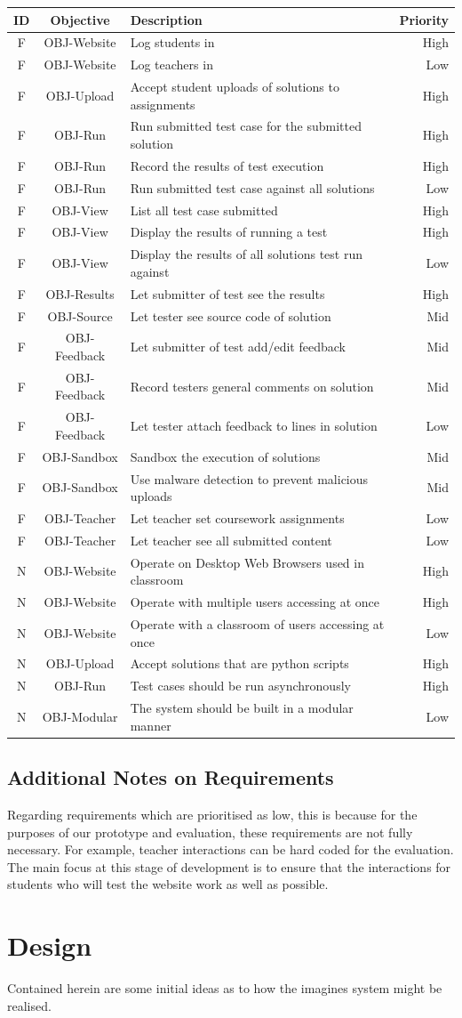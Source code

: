 \documentclass[a4paper,11pt]{report}
\newcounter{FunCount}
\newcounter{NFunCount}
\newcommand{\freq}[3]{\addtocounter{FunCount}{1}F\arabic{FunCount} & OBJ-#1 & #2 & #3\\}
\newcommand{\nfreq}[3]{\addtocounter{NFunCount}{1}N\arabic{NFunCount} & OBJ-#1 & #2 & #3\\}
\begin{document}
\begin{longtable}{cclr}
\textbf{ID} & \textbf{Objective} & \textbf{Description} & \textbf{Priority}\\\hline
\freq{Website}{Log students in}{High}
\freq{Website}{Log teachers in}{Low}
\freq{Upload}{Accept student uploads of solutions to assignments}{High}
\freq{Run}{Run submitted test case for the submitted solution}{High}
\freq{Run}{Record the results of test execution}{High}
\freq{Run}{Run submitted test case against all solutions}{Low}
\freq{View}{List all test case submitted}{High}
\freq{View}{Display the results of running a test}{High}
\freq{View}{Display the results of all solutions test run against}{Low}
\freq{Results}{Let submitter of test see the results}{High}
\freq{Source}{Let tester see source code of solution}{Mid}
\freq{Feedback}{Let submitter of test add/edit feedback}{Mid}
\freq{Feedback}{Record testers general comments on solution}{Mid}
\freq{Feedback}{Let tester attach feedback to lines in solution}{Low}
\freq{Sandbox}{Sandbox the execution of solutions}{Mid}
\freq{Sandbox}{Use malware detection to prevent malicious uploads}{Mid}
\freq{Teacher}{Let teacher set coursework assignments}{Low}
\freq{Teacher}{Let teacher see all submitted content}{Low}
\nfreq{Website}{Operate on Desktop Web Browsers used in classroom}{High}
\nfreq{Website}{Operate with multiple users accessing at once}{High}
\nfreq{Website}{Operate with a classroom of users accessing at once}{Low}
\nfreq{Upload}{Accept solutions that are python scripts}{High}
\nfreq{Run}{Test cases should be run asynchronously}{High}
\nfreq{Modular}{The system should be built in a modular manner}{Low}
\end{longtable}

\subsection{Additional Notes on Requirements}
Regarding requirements which are prioritised as low, this is because for the purposes of our prototype and evaluation, these requirements are not fully necessary. For example, teacher interactions can be hard coded for the evaluation. The main focus at this stage of development is to ensure that the interactions for students who will test the website work as well as possible.

\section{Design}
Contained herein are some initial ideas as to how the imagines system might be realised.
\end{document}
